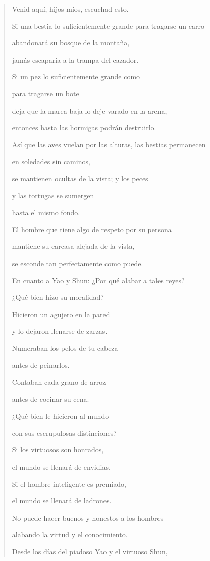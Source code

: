 \begin{quote}
Venid aquí, hijos míos, escuchad esto.

Si una bestia lo suficientemente grande para tragarse un carro

abandonará su bosque de la montaña,

jamás escaparía a la trampa del cazador.

Si un pez lo suficientemente grande como

para tragarse un bote

deja que la marea baja lo deje varado en la arena,

entonces hasta las hormigas podrán destruirlo.

Así que las aves vuelan por las alturas, las bestias permanecen

en soledades sin caminos,

se mantienen ocultas de la vista; y los peces

y las tortugas se sumergen

hasta el mismo fondo.

El hombre que tiene algo de respeto por su persona

mantiene su carcasa alejada de la vista,

se esconde tan perfectamente como puede.

En cuanto a Yao y Shun: ¿Por qué alabar a tales reyes?

¿Qué bien hizo su moralidad?

Hicieron un agujero en la pared

y lo dejaron llenarse de zarzas.

Numeraban los pelos de tu cabeza

antes de peinarlos.

Contaban cada grano de arroz

antes de cocinar su cena.

¿Qué bien le hicieron al mundo

con sus escrupulosas distinciones?

Si los virtuosos son honrados,

el mundo se llenará de envidias.

Si el hombre inteligente es premiado,

el mundo se llenará de ladrones.

No puede hacer buenos y honestos a los hombres

alabando la virtud y el conocimiento.

Desde los días del piadoso Yao y el virtuoso Shun,


\end{quote}
